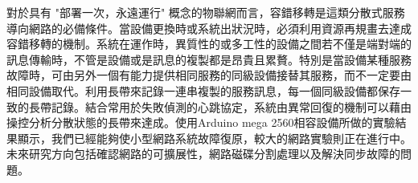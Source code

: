 \begin{abstractCH}

\setlength{\baselineskip}{1.5em}

對於具有 "部署一次，永遠運行" 概念的物聯網而言，容錯移轉是這類分散式服務導向網路的必備條件。當設備更換時或系統出狀況時，必須利用資源再規畫去達成容錯移轉的機制。系統在運作時，異質性的或多工性的設備之間若不僅是端對端的訊息傳輸時，不管是設備或是訊息的複製都是昂貴且累贅。特別是當設備某種服務故障時，可由另外一個有能力提供相同服務的同級設備接替其服務，而不一定要由相同設備取代。利用長帶來記錄一連串複製的服務訊息，每一個同級設備都保存一致的長帶記錄。結合常用於失敗偵測的心跳協定，系統由異常回復的機制可以藉由操控分析分散狀態的長帶來達成。使用Arduino mega 2560相容設備所做的實驗結果顯示，我們已經能夠使小型網路系統故障復原，較大的網路實驗則正在進行中。未來研究方向包括確認網路的可擴展性，網路磁碟分割處理以及解決同步故障的問題。

\end{abstractCH}
